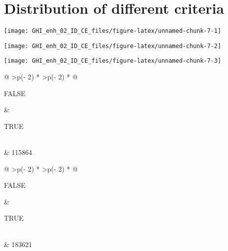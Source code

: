 \documentclass[
  10pt,
  a4paper,oneside]{article}
\begin{document}
\FloatBarrier

\hypertarget{distribution-of-different-criteria}{%
\section{Distribution of different criteria}\label{distribution-of-different-criteria}}

\begin{center}\texttt{[image: GHI\_enh\_02\_ID\_CE\_files/figure-latex/unnamed-chunk-7-1]} \end{center}

\begin{center}\texttt{[image: GHI\_enh\_02\_ID\_CE\_files/figure-latex/unnamed-chunk-7-2]} \end{center}

\begin{center}\texttt{[image: GHI\_enh\_02\_ID\_CE\_files/figure-latex/unnamed-chunk-7-3]} \end{center}

\begin{longtable}[]{@{}
  >{\raggedleft\arraybackslash}p{(\columnwidth - 2\tabcolsep) * }
  >{\raggedleft\arraybackslash}p{(\columnwidth - 2\tabcolsep) * }@{}}
\toprule\noalign{}
\begin{minipage}[b]{\linewidth}\raggedleft
FALSE
\end{minipage} & \begin{minipage}[b]{\linewidth}\raggedleft
TRUE
\end{minipage} \\
\midrule\noalign{}
\endhead
\bottomrule\noalign{}
 & 115864 \\
\end{longtable}

\begin{longtable}[]{@{}
  >{\raggedleft\arraybackslash}p{(\columnwidth - 2\tabcolsep) * }
  >{\raggedleft\arraybackslash}p{(\columnwidth - 2\tabcolsep) * }@{}}
\toprule\noalign{}
\begin{minipage}[b]{\linewidth}\raggedleft
FALSE
\end{minipage} & \begin{minipage}[b]{\linewidth}\raggedleft
TRUE
\end{minipage} \\
\midrule\noalign{}
\endhead
\bottomrule\noalign{}
 & 183621 \\
\end{longtable}
\end{document}
